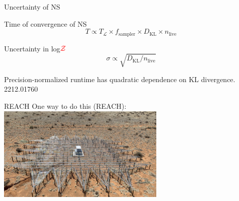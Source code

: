 \documentclass[aspectratio=169, 11pt]{beamer}
\begin{document}
\begin{frame}{Uncertainty of NS}

\begin{block}{Time of convergence of NS}
    \begin{equation}
        T \propto T_{\mathcal{L}} \times f_{\textrm{sampler}} \times D_{\textrm{KL}} \times n_{\textrm{live}} 
    \end{equation}
\end{block}
\begin{block}{Uncertainty in log$\textcolor{red}{\mathcal{Z}}$}
    \begin{equation}
        \sigma \propto \sqrt{D_{\textrm{KL}} / n_{\textrm{live}}}
    \end{equation}
\end{block}

\alert{Precision-normalized} runtime has quadratic dependence on KL divergence. \textcolor{cfgrey}{2212.01760}
    
\end{frame}

\begin{frame}{REACH}
\vspace{2em}
One way to do this (REACH):
\vfill
\centering
\includegraphics[width=0.6\textwidth]{Ca_Foscari Beamer/antenna.png}

\end{frame}
\end{document}
